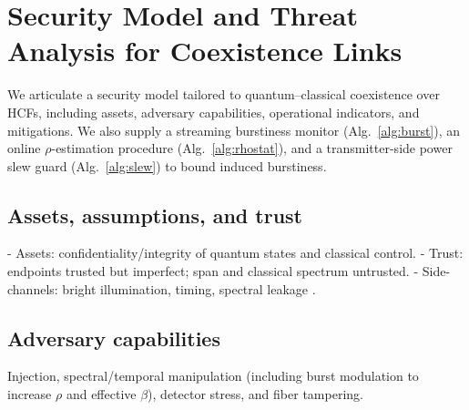 \documentclass{article}
\begin{document}
\section{Security Model and Threat Analysis for Coexistence Links}\label{sec:security}
We articulate a security model tailored to quantum--classical coexistence over HCFs, including assets, adversary capabilities, operational indicators, and mitigations. We also supply a streaming burstiness monitor (Alg.~\ref{alg:burst}), an online \(\rho\)-estimation procedure (Alg.~\ref{alg:rhostat}), and a transmitter-side power slew guard (Alg.~\ref{alg:slew}) to bound induced burstiness.

\subsection{Assets, assumptions, and trust}
- Assets: confidentiality/integrity of quantum states and classical control.
- Trust: endpoints trusted but imperfect; span and classical spectrum untrusted.
- Side-channels: bright illumination, timing, spectral leakage \cite{Pirandola2020AOP,Lydersen2010NatPhoton,Gerhardt2011NatComm}.

\subsection{Adversary capabilities}
Injection, spectral/temporal manipulation (including burst modulation to increase \(\rho\) and effective \(\beta\)), detector stress, and fiber tampering.
\end{document}
